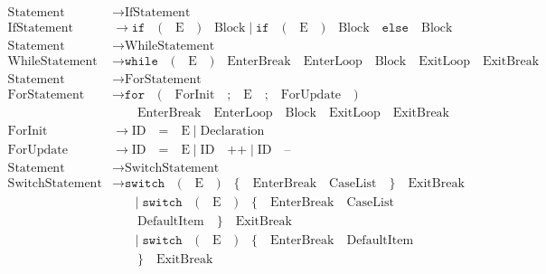 \documentclass[letterpaper,12pt,oneside]{article}
\begin{document}
\begin{align*}
\text{Statement} &\rightarrow \text{IfStatement} \\
\text{IfStatement} &\rightarrow \texttt{if} \quad \texttt{(} \quad \text{E} \quad \texttt{)} \quad \text{Block} \mid \texttt{if} \quad \texttt{(} \quad \text{E} \quad \texttt{)} \quad \text{Block} \quad \texttt{else} \quad \text{Block} \\
\text{Statement} &\rightarrow \text{WhileStatement} \\
\text{WhileStatement} &\rightarrow \texttt{while} \quad \texttt{(} \quad \text{E} \quad \texttt{)} \quad \text{EnterBreak} \quad \text{EnterLoop} \quad \text{Block} \quad \text{ExitLoop} \quad \text{ExitBreak} \\
\text{Statement} &\rightarrow \text{ForStatement} \\
\text{ForStatement} &\rightarrow \texttt{for} \quad \texttt{(} \quad \text{ForInit} \quad \texttt{;} \quad \text{E} \quad \texttt{;} \quad \text{ForUpdate} \quad \texttt{)} \\
                    &\mathrel{\phantom{\rightarrow}} \quad \text{EnterBreak} \quad \text{EnterLoop} \quad \text{Block} \quad \text{ExitLoop} \quad \text{ExitBreak} \\
\text{ForInit} &\rightarrow \text{ID} \quad \texttt{=} \quad \text{E} \mid \text{Declaration} \\
\text{ForUpdate} &\rightarrow \text{ID} \quad \texttt{=} \quad \text{E} \mid \text{ID} \quad \texttt{++} \mid \text{ID} \quad \texttt{--} \\
\text{Statement} &\rightarrow \text{SwitchStatement} \\
\text{SwitchStatement} &\rightarrow \texttt{switch} \quad \texttt{(} \quad \text{E} \quad \texttt{)} \quad \texttt{\{} \quad \text{EnterBreak} \quad \text{CaseList} \quad \texttt{\}} \quad \text{ExitBreak} \\
                       &\mathrel{\phantom{\rightarrow}} \mid \texttt{switch} \quad \texttt{(} \quad \text{E} \quad \texttt{)} \quad \texttt{\{} \quad \text{EnterBreak} \quad \text{CaseList} \\
                       &\mathrel{\phantom{\rightarrow}} \quad \text{DefaultItem} \quad \texttt{\}} \quad \text{ExitBreak} \\
                       &\mathrel{\phantom{\rightarrow}} \mid \texttt{switch} \quad \texttt{(} \quad \text{E} \quad \texttt{)} \quad \texttt{\{} \quad \text{EnterBreak} \quad \text{DefaultItem} \\
                       &\mathrel{\phantom{\rightarrow}} \quad \texttt{\}} \quad \text{ExitBreak} \\

\end{align*}
\end{document}
